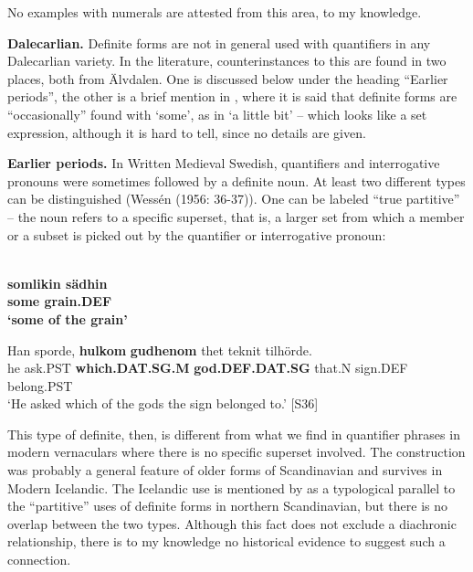 \z

No examples with numerals are attested from this area, to my knowledge.

\textbf{Dalecarlian. }Definite forms are not in general used with quantifiers in any Dalecarlian variety. In the literature, counterinstances to this are found in two places, both from Älvdalen. One is discussed below under the heading “Earlier periods”, the other is a brief mention in \citet[95]{Levander1909}, where it is said that definite forms are “occasionally” found with ‘some’, as in ‘a little bit’ – which looks like a set expression, although it is hard to tell, since no details are given.

\textbf{Earlier periods.} In Written Medieval Swedish, quantifiers and interrogative pronouns were sometimes followed by a definite noun. At least two different types can be distinguished (Wessén (1956: 36-37)). One can be labeled “true partitive” – the noun refers to a specific superset, that is, a larger set from which a member or a subset is picked out by the quantifier or interrogative pronoun:

\ea\label{}
\\
\gll\bfseries
somlikin  sädhin\\
\bfseries
some  grain.DEF\\
\glt ‘some of the grain’

\z

\ea
\gll Han  sporde,  \textbf{hulkom} \textbf{gudhenom} thet  teknit  tilhörde.\\
he  ask.PST  \textbf{which.DAT.SG.M} \textbf{god.DEF.DAT.SG} that.N  sign.DEF  belong.PST\\
\glt ‘He asked which of the gods the sign belonged to.’ [S36]

\z

This type of definite, then, is different from what we find in quantifier phrases in modern vernaculars where there is no specific superset involved. The construction was probably a general feature of older forms of Scandinavian and survives in Modern Icelandic. The Icelandic use is mentioned by \citet{Riesler2002} as a typological parallel to the “partitive” uses of definite forms in northern Scandinavian, but there is no overlap between the two types. Although this fact does not exclude a diachronic relationship, there is to my knowledge no historical evidence to suggest such a connection.

